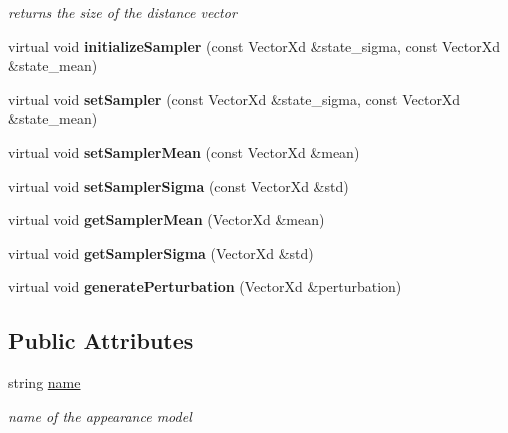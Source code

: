 \begin{DoxyCompactItemize}
\begin{DoxyCompactList}\small\item\em returns the size of the distance vector \end{DoxyCompactList}\item 
\hypertarget{classAppearanceModel_a8742b3a634db0cf593ab510bced23b3c}{virtual void {\bfseries initialize\-Sampler} (const Vector\-Xd \&state\-\_\-sigma, const Vector\-Xd \&state\-\_\-mean)}\label{classAppearanceModel_a8742b3a634db0cf593ab510bced23b3c}

\item 
\hypertarget{classAppearanceModel_aa0a9bbaf88503f34e300617e77a44db9}{virtual void {\bfseries set\-Sampler} (const Vector\-Xd \&state\-\_\-sigma, const Vector\-Xd \&state\-\_\-mean)}\label{classAppearanceModel_aa0a9bbaf88503f34e300617e77a44db9}

\item 
\hypertarget{classAppearanceModel_a62f7b402152d705bce3d93b3b4c31ee5}{virtual void {\bfseries set\-Sampler\-Mean} (const Vector\-Xd \&mean)}\label{classAppearanceModel_a62f7b402152d705bce3d93b3b4c31ee5}

\item 
\hypertarget{classAppearanceModel_a38745a9a2be3dea1fd43b7487f6a5e39}{virtual void {\bfseries set\-Sampler\-Sigma} (const Vector\-Xd \&std)}\label{classAppearanceModel_a38745a9a2be3dea1fd43b7487f6a5e39}

\item 
\hypertarget{classAppearanceModel_a6157f4e6bdb3c7e606634dd401a1386c}{virtual void {\bfseries get\-Sampler\-Mean} (Vector\-Xd \&mean)}\label{classAppearanceModel_a6157f4e6bdb3c7e606634dd401a1386c}

\item 
\hypertarget{classAppearanceModel_afd998b10993f202ea57dd9fcf59c0ebb}{virtual void {\bfseries get\-Sampler\-Sigma} (Vector\-Xd \&std)}\label{classAppearanceModel_afd998b10993f202ea57dd9fcf59c0ebb}

\item 
\hypertarget{classAppearanceModel_a4ccc358cb49d5ddc68a1b58c8d84f468}{virtual void {\bfseries generate\-Perturbation} (Vector\-Xd \&perturbation)}\label{classAppearanceModel_a4ccc358cb49d5ddc68a1b58c8d84f468}

\end{DoxyCompactItemize}
\subsection*{Public Attributes}
\begin{DoxyCompactItemize}
\item 
\hypertarget{classAppearanceModel_a593c80caffb59c01fff7dcb820d57285}{string \hyperlink{classAppearanceModel_a593c80caffb59c01fff7dcb820d57285}{name}}\label{classAppearanceModel_a593c80caffb59c01fff7dcb820d57285}

\begin{DoxyCompactList}\small\item\em name of the appearance model \end{DoxyCompactList}\end{DoxyCompactItemize}
